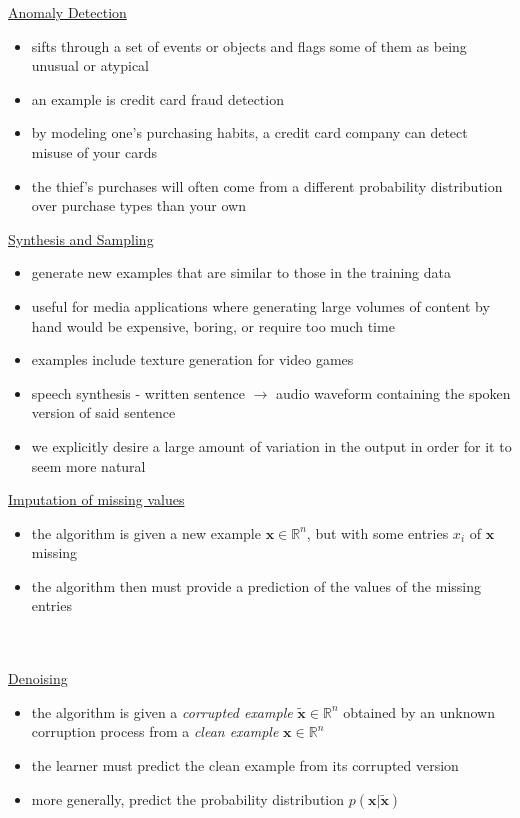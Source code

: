 \documentclass[11pt, twocolumn]{report}
\def\realnumbers{\mathbb{R}}
\begin{document}
\underline{Anomaly Detection}
\begin{itemize}
  \item sifts through a set of events or objects and flags some of them as
    being unusual or atypical
  \item an example is credit card fraud detection
  \item by modeling one's purchasing habits, a credit card company can detect
    misuse of your cards
  \item the thief's purchases will often come from a different probability
    distribution over purchase types than your own
\end{itemize}

\underline{Synthesis and Sampling}
\begin{itemize}
  \item generate new examples that are similar to those in the training data
  \item useful for media applications where generating large volumes of content
    by hand would be expensive, boring, or require too much time
  \item examples include texture generation for video games
  \item speech synthesis - written sentence $\to$ audio waveform containing the
    spoken version of said sentence
  \item we explicitly desire a large amount of variation in the output in order
    for it to seem more natural
\end{itemize}

\underline{Imputation of missing values}
\begin{itemize}
  \item the algorithm is given a new example $\bm{x} \in \realnumbers^n$, but
    with some entries $x_i$ of $\bm{x}$ missing
  \item the algorithm then must provide a prediction of the values of the
    missing entries\\\\\\
\end{itemize} 

\underline{Denoising}
\begin{itemize}
  \item the algorithm is given a \textit{corrupted example} $\widetilde{\bm{x}}
    \in \realnumbers^n$ obtained by an unknown corruption process from a
    \textit{clean example} $\bm{x} \in \realnumbers^n$
  \item the learner must predict the clean example from its corrupted version 
  \item more generally, predict the probability distribution $p(\bm{x} |
    \widetilde{\bm{x}})$
\end{itemize}
\end{document}
